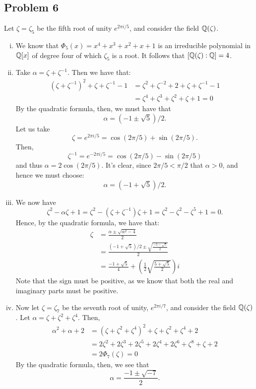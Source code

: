 \documentclass{../../mathnotes}
\begin{document}
\subsection*{Problem 6}

Let $\zeta=\zeta_5$ be the fifth root of unity $e^{2\pi i/5}$, and consider the field $\mathbb{Q}(\zeta)$.
\begin{enumerate}[(i)]
    \item We know that $\Phi_5(x)=x^4+x^3+x^2+x+1$ is an irreducible polynomial in $\mathbb{Q}[x]$ of degree four of which
        $\zeta_5$ is a root. It follows that $[\mathbb{Q}(\zeta):\mathbb{Q}]=4$.
    \item Take $\alpha=\zeta+\zeta^{-1}$. Then we have that:
        \begin{align*}
            (\zeta+\zeta^{-1})^2+\zeta+\zeta^{-1}-1&=\zeta^2+\zeta^{-2}+2+\zeta+\zeta^{-1}-1\\
            &=\zeta^4+\zeta^3+\zeta^2+\zeta+1=0
        \end{align*}
        By the quadratic formula, then, we must have that
        \[\alpha=\left( -1\pm\sqrt{5} \right)/2.\]
        Let us take
        \[\zeta=e^{2\pi i/5}=\cos\left( 2\pi/5 \right)+\sin\left( 2\pi/5 \right).\]
        Then,
        \[\zeta^{-1}=e^{-2\pi i/5}=\cos\left( 2\pi/5 \right)-\sin\left( 2\pi/5 \right)\]
        and thus $\alpha=2\cos\left( 2\pi/5 \right)$. It's clear, since $2\pi/5<\pi/2$ that
        $\alpha>0$, and hence we must choose:
        \[\alpha=\left( -1+\sqrt{5} \right)/2.\]
    \item We now have
        \[\zeta^2-\alpha\zeta+1=\zeta^2-\left( \zeta+\zeta^{-1} \right)\zeta+1=\zeta^2-\zeta^2-\zeta^5+1=0.\]
        Hence, by the quadratic formula, we have that:
        \begin{align*}
            \zeta&=\frac{\alpha\pm\sqrt{\alpha^2-4}}{2}\\
            &=\frac{\left( -1+\sqrt{5} \right)/2\pm\sqrt{\frac{-5-\sqrt{5}}{2}}}{2}\\
            &=\frac{-1+\sqrt{5}}{4}+\left( \frac{1}{2}\sqrt{\frac{5+\sqrt{5}}{2}} \right)i
        \end{align*}
        Note that the sign must be positive, as we know that both the real and imaginary parts must be positive.
    \item Now let $\zeta=\zeta_7$ be the seventh root of unity, $e^{2\pi i/7}$, and consider the field $\mathbb{Q}(\zeta)$.
        Let $\alpha=\zeta+\zeta^2+\zeta^4$. Then,
        \begin{align*}
            \alpha^2+\alpha+2&=(\zeta+\zeta^2+\zeta^4)^2+\zeta+\zeta^2+\zeta^4+2\\
            &=2\zeta^2+2\zeta^3+2\zeta^5+2\zeta^4+2\zeta^6+\zeta^8+\zeta+2\\
            &=2\Phi_7(\zeta)=0
        \end{align*}
        By the quadratic formula, then, we see that
        \[\alpha=\frac{-1\pm\sqrt{-7}}{2}.\]


\end{enumerate}
\end{document}
